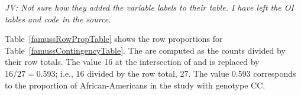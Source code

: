 \begin{doublespace}
\textit{JV: Not sure how they added the variable labels to their table. I have left the OI tables and code in the source.}

Table~\ref{famussRowPropTable} shows the row proportions for Table~\ref{famussContingencyTable}. The  are computed as the counts divided by their row totals. The value 16 at the intersection of  and  is replaced by $16/27=0.593$; i.e., 16 divided by the row total, 27. The value 0.593 corresponds to the proportion of African-Americans in the study with genotype CC.


\end{doublespace}
